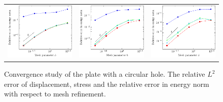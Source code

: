 \documentclass{article}
\begin{document}
\begin{figure}[h]
\begin{tabular}{ccc}
\includegraphics[width=.31\linewidth]{energy_p_2} & \includegraphics[width=.31\linewidth]{energy_p_3} & \includegraphics[width=.31\linewidth]{energy_p_4}
\end{tabular}
    \caption{Convergence study of the plate with a circular hole. The relative $L^2$ error of displacement, stress and the relative error in energy norm with respect to mesh refinement.}
	\label{fig:platewithhole_convergence}
\end{figure}
\end{document}
